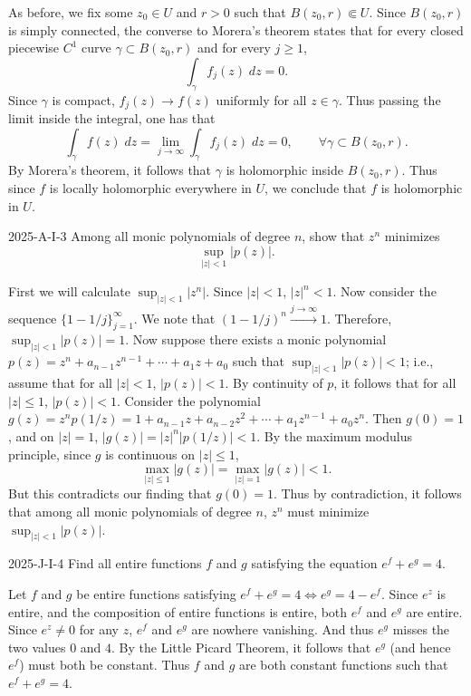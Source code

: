 \documentclass{article}
\begin{document}
	As before, we fix some $z_{0}\in U$ and $r > 0$ such that $B(z_{0}, r) \Subset U$. Since $B(z_{0}, r)$ is simply connected, the converse to Morera's theorem states that for every closed piecewise $C^{1}$ curve $\gamma \subset B(z_{0}, r)$ and for every $j \geq 1$, 
	\begin{equation*}
		\int_{\gamma}f_{j}(z)\;dz = 0. 
	\end{equation*}
	Since $\gamma$ is compact, $f_{j}(z) \to f(z)$ uniformly for all $z \in \gamma$. Thus passing the limit inside the integral, one has that 
	\begin{equation*}
		\int_{\gamma}f(z)\;dz = \lim_{j \to \infty}\int_{\gamma}f_{j}(z)\;dz = 0, \qquad \forall \gamma \subset B(z_{0}, r). 
	\end{equation*}
	By Morera's theorem, it follows that $\gamma$ is holomorphic inside $B(z_{0}, r)$. Thus since $f$ is locally holomorphic everywhere in $U$, we conclude that $f$ is holomorphic in $U$. 
	
	\begin{prb}{2025-A-I-3}
		Among all monic polynomials of degree $n$, show that $z^{n}$ minimizes
		\begin{equation*}
			\sup_{|z| < 1}|p(z)|. 
		\end{equation*}
	\end{prb}
	First we will calculate $\sup_{|z| < 1}|z^{n}|$. Since $|z| < 1$, $|z|^{n} < 1$. Now consider the sequence $\{1 - 1/j\}_{j= 1}^{\infty}$. We note that $(1 - 1/j)^{n} \xrightarrow{j \to \infty} 1$. Therefore, $\sup_{|z| < 1}|p(z)| = 1$. Now suppose there exists a monic polynomial $p(z) = z^{n} + a_{n-1}z^{n-1} + \dotsm + a_{1}z + a_{0}$ such that $\sup_{|z| < 1}|p(z)| < 1$; i.e., assume that for all $|z| < 1$, $|p(z)| < 1$. By continuity of $p$, it follows that for all $|z| \leq 1$, $|p(z)| < 1$. Consider the polynomial $g(z) = z^{n}p(1/z) = 1 + a_{n - 1}z + a_{n-2}z^{2} + \dotsm + a_{1}z^{n-1} + a_{0}z^{n}$. Then $g(0) = 1$, and on $|z| = 1$, $|g(z)| = |z|^{n}|p(1/z)| < 1$. By the maximum modulus principle, since $g$ is continuous on $|z| \leq 1$, 
	\begin{equation*}
		\max_{|z|\leq 1}|g(z)| = \max_{|z| = 1}|g(z)| < 1. 
	\end{equation*}
	But this contradicts our finding that $g(0) = 1$. Thus by contradiction, it follows that among all monic polynomials of degree $n$, $z^{n}$ must minimize $\sup_{|z| < 1}|p(z)|$. 
	
	\begin{prb}{2025-J-I-4}
		Find all entire functions $f$ and $g$ satisfying the equation $e^{f} + e^{g} = 4$. 
	\end{prb}
	Let $f$ and $g$ be entire functions satisfying $e^{f} + e^{g} = 4 \iff e^{g}= 4 - e^{f}$. Since $e^{z}$ is entire, and the composition of entire functions is entire, both $e^{f}$ and $e^{g}$ are entire. Since $e^{z} \neq 0$ for any $z$, $e^{f}$ and $e^{g}$ are nowhere vanishing. And thus $e^{g}$ misses the two values $0$ and $4$. By the Little Picard Theorem, it follows that $e^{g}$ (and hence $e^{f}$) must both be constant. Thus $f$ and $g$ are both constant functions such that $e^{f} + e^{g} = 4$. 
	
\end{document}

